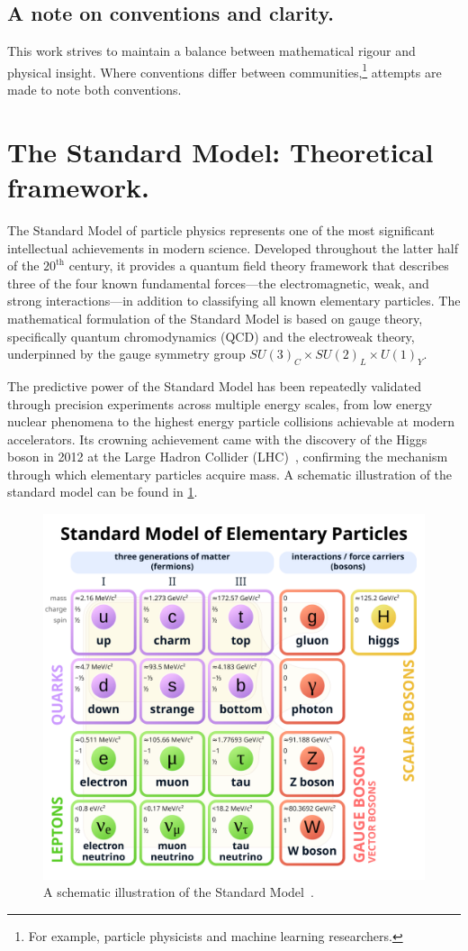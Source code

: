\begin{definition}
    \subsection{A note on conventions and clarity.}
         This work strives to maintain a balance between mathematical rigour and physical insight.
         Where conventions differ between communities,\footnote{For example, particle physicists and machine learning researchers.} attempts are made to note both conventions.
         
\section{The Standard Model: Theoretical framework.}
The Standard Model of particle physics represents one of the most significant intellectual achievements in modern science.
%
Developed throughout the latter half of the $20^{\text{th}}$ century, it provides a quantum field theory framework that describes three of the four known fundamental forces—the electromagnetic, weak, and strong interactions---in addition to classifying all known elementary particles.
%
The mathematical formulation of the Standard Model is based on gauge theory, specifically quantum chromodynamics (QCD) and the electroweak theory, underpinned by the gauge symmetry group \(SU(3)_C\times SU(2)_L\times U(1)_Y\).

The predictive power of the Standard Model has been repeatedly validated through precision experiments across multiple energy scales, from low energy nuclear phenomena to the highest energy particle collisions achievable at modern accelerators.
%
Its crowning achievement came with the discovery of the Higgs boson in 2012 at the Large Hadron Collider (LHC)~\cite{ATLAS:2012yve, collaboration_observation_2012}, confirming the mechanism through which elementary particles acquire mass.
%
A schematic illustration of the standard model can be found in \cref{fig:sm}.

\begin{figure}
    \centering
    \includegraphics[width=0.5\linewidth]{figures/chapter-01/Standard_Model_of_Elementary_Particles.svg.png}
    \caption{
        A schematic illustration of the Standard Model~\cite{wiki:stdmodel}.
    }
    \label{fig:sm}
\end{figure}

\end{definition}
